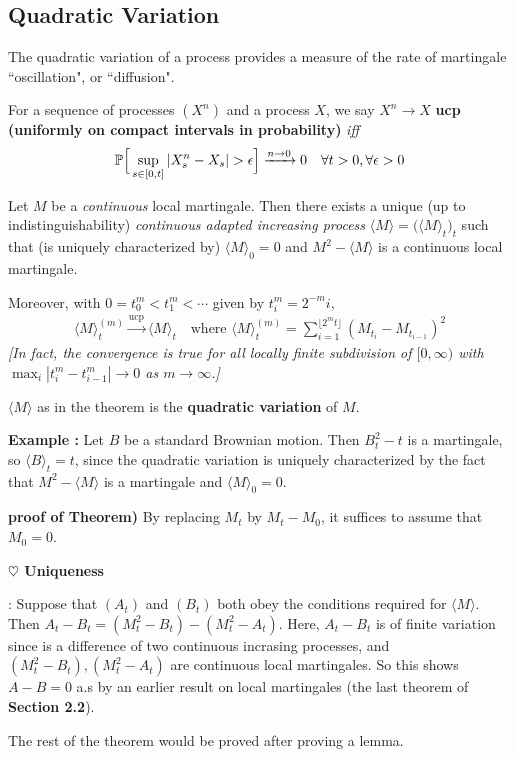 \documentclass[12pt,a4paper]{article}
\newenvironment{proof}
{\begin{changemargin}{0.5cm}{0.5cm} 
	}%
	{\end{changemargin}
}
\newenvironment{subproof}
{\begin{changemargin}{0.5cm}{0.5cm} 
	}%
	{\end{changemargin}
}
\newenvironment{p}
{\begin{proof} 
	}%
	{\end{proof}
}
\begin{document}
\subsection{Quadratic Variation}

The quadratic variation of a process provides a measure of the rate of martingale ``oscillation", or ``diffusion". 
\s

 For a sequence of processes $(X^n)$ and a process $X$, we say $X^n \rightarrow X$ \textbf{ucp (uniformly on compact intervals in probability)} \emph{iff}
\begin{align*}
\mathbb{P} \Big[ \sup_{s\in [0,t]} |X_s^n -X_s | > \epsilon \Big] \xrightarrow{n\rightarrow 0} 0 \quad \forall t >0, \forall \epsilon >0
\end{align*}
\s

\thm Let $M$ be a \emph{continuous} local martingale. Then there exists a unique (up to indistinguishability) \emph{continuous adapted increasing process} $\langle M \rangle = \big( \langle M \rangle_t \big)_t$ such that (is uniquely characterized by) $\langle M \rangle_0 =0$ and $M^2 -\langle M \rangle$ is a continuous local martingale.

\quad Moreover, with $0=t_0^m < t_1^m < \cdots$ given by $t_i^m = 2^{-m}i$,
\begin{align*}
\langle M \rangle_t^{(m)} \xrightarrow{\text{ucp}} \langle M \rangle_t \quad \text{where } \langle M \rangle_t^{(m)} = \sum_{i=1}^{\lfloor 2^m t \rfloor} (M_{t_i} - M_{t_{i-1}})^2
\end{align*}
\emph{[In fact, the convergence is true for all locally finite subdivision of $[0, \infty)$ with $\max_i |t_i^m - t_{i-1}^m| \rightarrow 0$ as $m\rightarrow \infty$.]}
\s

 $\langle M \rangle$ as in the theorem is the \textbf{quadratic variation} of $M$.
\s

\textbf{Example :} Let $B$ be a standard Brownian motion. Then $B_t^2 -t$ is a martingale, so $\langle B \rangle_t =t$, since the quadratic variation is uniquely characterized by the fact that $M^2 -\langle M \rangle$ is a martingale and $\langle M \rangle_0=0$.
\s

\begin{p}
\textbf{proof of Theorem)} By replacing $M_t$ by $M_t - M_0$, it suffices to assume that $M_0=0$.
\s

\textbf{$\heartsuit$ Uniqueness}
\begin{subproof}
: Suppose that $(A_t)$ and $(B_t)$ both obey the conditions required for $\langle M \rangle$. Then $A_t -B_t = (M_t^2 - B_t) - (M_t^2 - A_t)$. Here, $A_t - B_t$ is of finite variation since is a difference of two continuous incrasing processes, and $(M_t^2 -B_t), (M_t^2 -A_t)$ are continuous local martingales. So this shows $A-B=0$ a.s by an earlier result on local martingales (the last theorem of \textbf{Section 2.2}).
\end{subproof}

The rest of the theorem would be proved after proving a lemma.
\end{p}
\s
\end{document}
